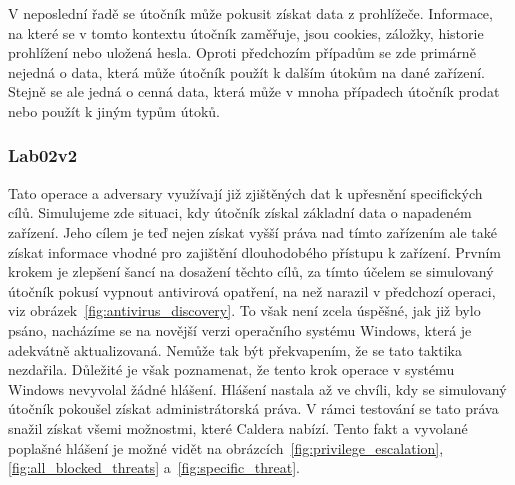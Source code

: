 
V neposlední řadě se útočník může pokusit získat data z prohlížeče.
Informace, na které se v tomto kontextu útočník zaměřuje, jsou cookies, záložky, historie prohlížení nebo uložená hesla.
Oproti předchozím případům se zde primárně nejedná o data, která může útočník použít k dalším útokům na dané zařízení.
Stejně se ale jedná o cenná data, která může v mnoha případech útočník prodat nebo použít k jiným typům útoků.

\subsubsection{Lab02v2}
Tato operace a adversary využívají již zjištěných dat k upřesnění specifických cílů.
Simulujeme zde situaci, kdy útočník získal základní data o napadeném zařízení.
Jeho cílem je teď nejen získat vyšší práva nad tímto zařízením ale také získat informace vhodné pro zajištění dlouhodobého přístupu k zařízení.
Prvním krokem je zlepšení šancí na dosažení těchto cílů, za tímto účelem se simulovaný útočník pokusí vypnout antivirová opatření, na než narazil v předchozí operaci, viz obrázek~\ref{fig:antivirus_discovery}.
To však není zcela úspěšné, jak již bylo psáno, nacházíme se na novější verzi operačního systému Windows, která je adekvátně aktualizovaná.
Nemůže tak být překvapením, že se tato taktika nezdařila.
Důležité je však poznamenat, že tento krok operace v systému Windows nevyvolal žádné hlášení.
Hlášení nastala až ve chvíli, kdy se simulovaný útočník pokoušel získat administrátorská práva.
V rámci testování se tato práva snažil získat všemi možnostmi, které Caldera nabízí.
Tento fakt a vyvolané poplašné hlášení je možné vidět na obrázcích~\ref{fig:privilege_escalation},\ref{fig:all_blocked_threats} a~\ref{fig:specific_threat}.

~
~
~


